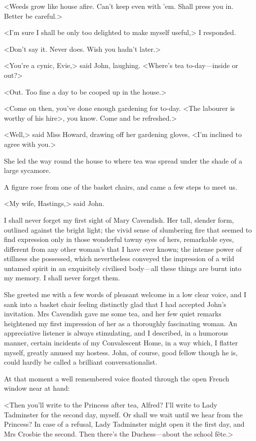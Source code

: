  <Weeds grow like house afire. Can't keep even with 'em. Shall press you in. Better be careful.> 

 <I'm sure I shall be only too delighted to make myself useful,> I responded. 

 <Don't say it. Never does. Wish you hadn't later.> 

 <You're a cynic, Evie,> said John, laughing. <Where's tea to-day—inside or out?> 

 <Out. Too fine a day to be cooped up in the house.> 

 <Come on then, you've done enough gardening for to-day. <The labourer is worthy of his hire>, you know. Come and be refreshed.> 

 <Well,> said Miss Howard, drawing off her gardening gloves, <I'm inclined to agree with you.> 

 She led the way round the house to where tea was spread under the shade of a large sycamore. 

 A figure rose from one of the basket chairs, and came a few steps to meet us. 

 <My wife, Hastings,> said John. 

 I shall never forget my first sight of Mary Cavendish. Her tall, slender form, outlined against the bright light; the vivid sense of slumbering fire that seemed to find expression only in those wonderful tawny eyes of hers, remarkable eyes, different from any other woman's that I have ever known; the intense power of stillness she possessed, which nevertheless conveyed the impression of a wild untamed spirit in an exquisitely civilised body—all these things are burnt into my memory. I shall never forget them. 

 She greeted me with a few words of pleasant welcome in a low clear voice, and I sank into a basket chair feeling distinctly glad that I had accepted John's invitation. Mrs Cavendish gave me some tea, and her few quiet remarks heightened my first impression of her as a thoroughly fascinating woman. An appreciative listener is always stimulating, and I described, in a humorous manner, certain incidents of my Convalescent Home, in a way which, I flatter myself, greatly amused my hostess. John, of course, good fellow though he is, could hardly be called a brilliant conversationalist. 

 At that moment a well remembered voice floated through the open French window near at hand: 

 <Then you'll write to the Princess after tea, Alfred? I'll write to Lady Tadminster for the second day, myself. Or shall we wait until we hear from the Princess? In case of a refusal, Lady Tadminster might open it the first day, and Mrs Crosbie the second. Then there's the Duchess—about the school fête.> 

